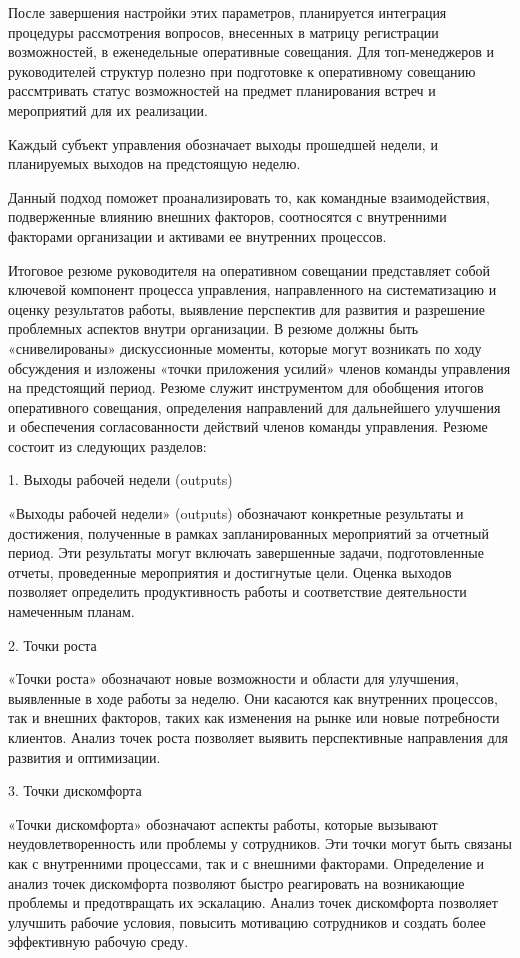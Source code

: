 \begin{multicols}{2}
После завершения настройки этих параметров, планируется интеграция
процедуры рассмотрения вопросов, внесенных в матрицу регистрации
возможностей, в еженедельные оперативные совещания. Для топ-менеджеров и
руководителей структур полезно при подготовке к оперативному совещанию
рассмтривать статус возможностей на предмет планирования встреч и
мероприятий для их реализации.

Каждый субъект управления обозначает выходы прошедшей недели, и
планируемых выходов на предстоящую неделю.

Данный подход поможет проанализировать то, как командные взаимодействия,
подверженные влиянию внешних факторов, соотносятся с внутренними
факторами организации и активами ее внутренних процессов.

Итоговое резюме руководителя на оперативном совещании представляет собой
ключевой компонент процесса управления, направленного на систематизацию
и оценку результатов работы, выявление перспектив для развития и
разрешение проблемных аспектов внутри организации. В резюме должны быть
«снивелированы» дискуссионные моменты, которые могут возникать по ходу
обсуждения и изложены «точки приложения усилий» членов команды
управления на предстоящий период. Резюме служит инструментом для
обобщения итогов оперативного совещания, определения направлений для
дальнейшего улучшения и обеспечения согласованности действий членов
команды управления. Резюме состоит из следующих разделов:

1. Выходы рабочей недели (outputs)

«Выходы рабочей недели» (outputs) обозначают конкретные результаты и
достижения, полученные в рамках запланированных мероприятий за отчетный
период. Эти результаты могут включать завершенные задачи, подготовленные
отчеты, проведенные мероприятия и достигнутые цели. Оценка выходов
позволяет определить продуктивность работы и соответствие деятельности
намеченным планам.

2. Точки роста

«Точки роста» обозначают новые возможности и области для улучшения,
выявленные в ходе работы за неделю. Они касаются как внутренних
процессов, так и внешних факторов, таких как изменения на рынке или
новые потребности клиентов. Анализ точек роста позволяет выявить
перспективные направления для развития и оптимизации.

3. Точки дискомфорта

«Точки дискомфорта» обозначают аспекты работы, которые вызывают
неудовлетворенность или проблемы у сотрудников. Эти точки могут быть
связаны как с внутренними процессами, так и с внешними факторами.
Определение и анализ точек дискомфорта позволяют быстро реагировать на
возникающие проблемы и предотвращать их эскалацию. Анализ точек
дискомфорта позволяет улучшить рабочие условия, повысить мотивацию
сотрудников и создать более эффективную рабочую среду.


\end{multicols}
